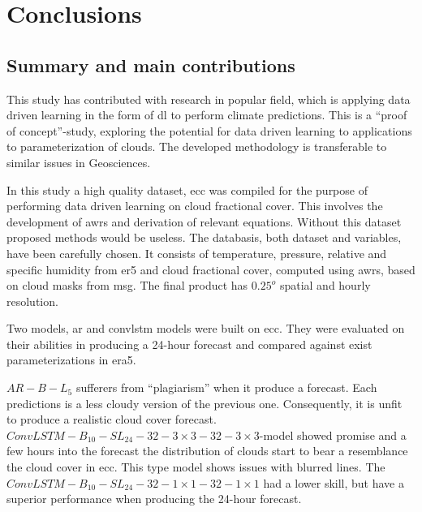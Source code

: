 \chapter{Conclusions}
\section{Summary and main contributions}
This study has contributed with research in popular field, which is applying data driven learning in the form of \acrshort{dl} to perform climate predictions.
This is a ``proof of concept''-study, exploring the potential for data driven learning to applications to parameterization of clouds. The developed methodology is transferable to similar issues in Geosciences.

In this study a high quality dataset, \acrfull{ecc} was compiled for the purpose of performing data driven learning on cloud fractional cover. This involves the development of \acrfull{awrs} and derivation of relevant equations. Without this dataset proposed methods would be useless. The databasis, both dataset and variables, have been carefully chosen. It consists of temperature, pressure, relative and specific humidity from \acrshort{er5} and cloud fractional cover, computed using \acrshort{awrs}, based on cloud masks from \acrshort{msg}. The final product has $0.25^o$ spatial and hourly resolution.

Two models, \acrfull{ar} and \acrfull{convlstm} models were built on \acrshort{ecc}. They were evaluated on their abilities in producing a 24-hour forecast and compared against exist parameterizations in \acrshort{era5}. 

$AR-B-L_5$ sufferers from ``plagiarism'' when it produce a forecast. Each predictions is a less cloudy version of the previous one. Consequently, it is unfit to produce a realistic cloud cover forecast.  $ConvLSTM-B_{10}-SL_{24}-32-3\times3-32-3 \times3$-model showed promise and a few hours into the forecast the distribution of clouds start to bear a resemblance the cloud cover in \acrshort{ecc}. This type model shows issues with blurred lines. 
The $ConvLSTM-B_{10}-SL_{24}-32-1\times1-32-1 \times1$ had a lower skill, but have
a superior performance when producing the 24-hour forecast.


